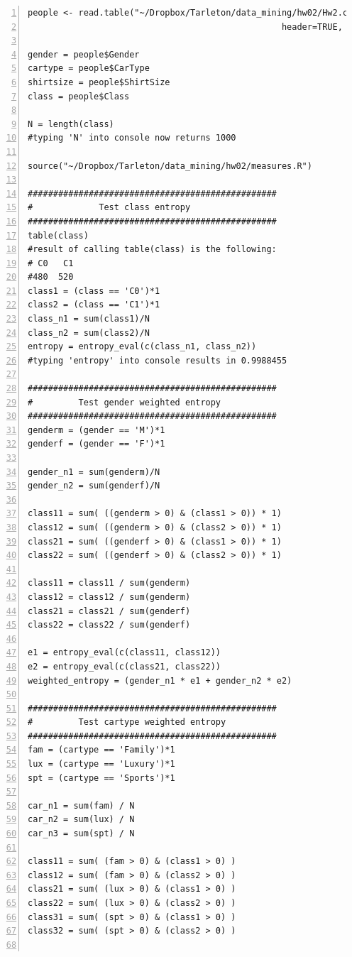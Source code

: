 \documentclass[11pt]{article}
\begin{document}
\begin{Verbatim}[numbers=left]
people <- read.table("~/Dropbox/Tarleton/data_mining/hw02/Hw2.csv", 
                                                  header=TRUE, sep=",")

gender = people$Gender
cartype = people$CarType
shirtsize = people$ShirtSize
class = people$Class

N = length(class)
#typing 'N' into console now returns 1000

source("~/Dropbox/Tarleton/data_mining/hw02/measures.R")

#################################################
#             Test class entropy
#################################################
table(class)
#result of calling table(class) is the following: 
# C0   C1
#480  520
class1 = (class == 'C0')*1
class2 = (class == 'C1')*1
class_n1 = sum(class1)/N
class_n2 = sum(class2)/N
entropy = entropy_eval(c(class_n1, class_n2))
#typing 'entropy' into console results in 0.9988455 

#################################################
#         Test gender weighted entropy
#################################################
genderm = (gender == 'M')*1
genderf = (gender == 'F')*1

gender_n1 = sum(genderm)/N
gender_n2 = sum(genderf)/N

class11 = sum( ((genderm > 0) & (class1 > 0)) * 1)
class12 = sum( ((genderm > 0) & (class2 > 0)) * 1)
class21 = sum( ((genderf > 0) & (class1 > 0)) * 1)
class22 = sum( ((genderf > 0) & (class2 > 0)) * 1)

class11 = class11 / sum(genderm)
class12 = class12 / sum(genderm)
class21 = class21 / sum(genderf)
class22 = class22 / sum(genderf)

e1 = entropy_eval(c(class11, class12))
e2 = entropy_eval(c(class21, class22))
weighted_entropy = (gender_n1 * e1 + gender_n2 * e2) 

#################################################
#         Test cartype weighted entropy
#################################################
fam = (cartype == 'Family')*1
lux = (cartype == 'Luxury')*1
spt = (cartype == 'Sports')*1

car_n1 = sum(fam) / N
car_n2 = sum(lux) / N
car_n3 = sum(spt) / N

class11 = sum( (fam > 0) & (class1 > 0) )
class12 = sum( (fam > 0) & (class2 > 0) )
class21 = sum( (lux > 0) & (class1 > 0) )
class22 = sum( (lux > 0) & (class2 > 0) )
class31 = sum( (spt > 0) & (class1 > 0) )
class32 = sum( (spt > 0) & (class2 > 0) )


\end{Verbatim}
\end{document}
